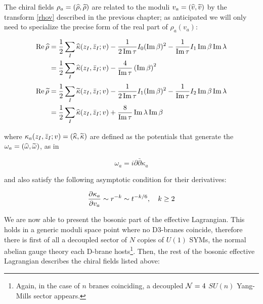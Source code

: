 The chiral fields $\rho_a = (\widehat{\rho},\widetilde{\rho})$ are related to the moduli $v_a = (\widehat{v}, \widetilde{v})$ by the transform \eqref{rhov} described in the previous chapter; as anticipated we will only need to specialize the precise form of the real part of $\rho_a(v_a)$:

\begin{align}
\begin{split}
	\operatorname{Re} \widehat{\rho} &= \frac{1}{2} \sum_I \widehat{\kappa}(z_I,\bar z_I ; v)  - \frac{1}{2\operatorname{Im} \tau} I_0 (\operatorname{Im} \beta)^2 - \frac{1}{\operatorname{Im} \tau} I_1 \operatorname{Im} \beta \operatorname{Im} \lambda\\
	&= \frac{1}{2} \sum_I \widehat{\kappa}(z_I,\bar z_I; v) -\frac{4}{\operatorname{Im}\tau} \left( \operatorname{Im}\beta \right)^2
	\label{rhofunv}
\end{split}
\end{align}
\begin{align}
\begin{split}
	\operatorname{Re} \widetilde{\rho} &= \frac{1}{2} \sum_I \widetilde{\kappa}(z_I,\bar z_I; v) - \frac{1}{2 \operatorname{Im} \tau}I_1(\operatorname{Im}\beta)^2-\frac{1}{\operatorname{Im}\tau}I_2 \operatorname{Im}\beta \operatorname{Im}\lambda\\
	&= \frac{1}{2} \sum_I \widehat{\kappa}(z_I,\bar z_I; v) + \frac{8}{\operatorname{Im}\tau} \operatorname{Im}\lambda \operatorname{Im}\beta 
	\label{}
\end{split}
\end{align}

where $\kappa_a(z_I,\bar z_I; v) = (\widehat{\kappa},\widetilde{\kappa})$ are defined as the potentials that generate the $\omega_a = (\widehat{\omega}, \widetilde{\omega})$, as in

\begin{equation}
	\omega_a = i \partial\bar \partial \kappa_a
	\label{defkappamain}
\end{equation}

and also satisfy the following asymptotic condition for their derivatives:

\begin{equation}
	\frac{\partial\kappa_a}{\partial v_a} \sim r^{-k} \sim t^{-k/6}, \quad k \geq 2
	\label{potentialcondition}
\end{equation}


We are now able to present the bosonic part of the effective Lagrangian. This holds in a generic moduli space point where no D3-branes coincide, therefore there is first of all a decoupled sector of $N$ copies of $U(1)$ SYMs, the normal abelian gauge theory each D-brane hosts\footnote{Again, in the case of $n$ branes coinciding, a decoupled $\mathcal{N}=4$ $SU(n)$ Yang-Mills sector appears.}. Then, the rest of the bosonic effective Lagrangian describes the chiral fields listed above:

